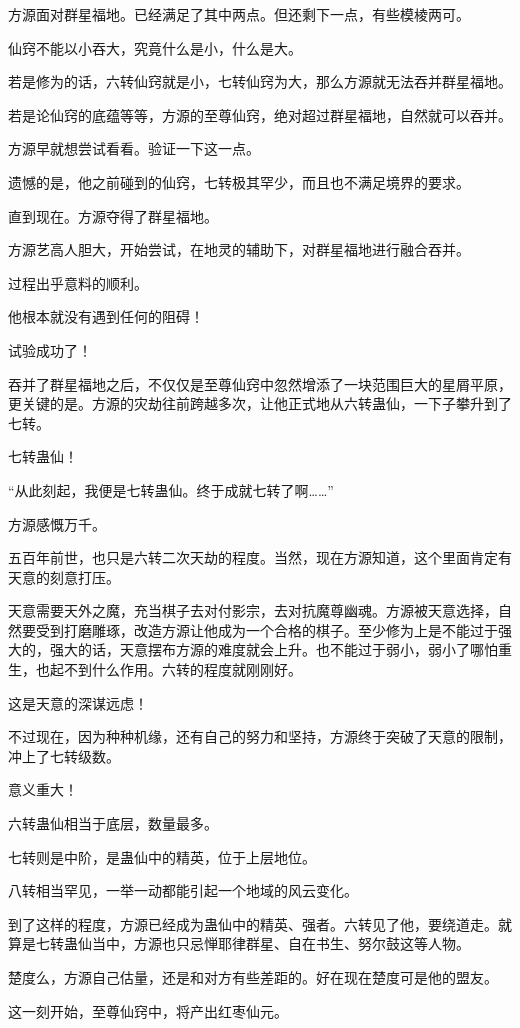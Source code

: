\begin{this_body}
方源面对群星福地。已经满足了其中两点。但还剩下一点，有些模棱两可。

仙窍不能以小吞大，究竟什么是小，什么是大。

若是修为的话，六转仙窍就是小，七转仙窍为大，那么方源就无法吞并群星福地。

若是论仙窍的底蕴等等，方源的至尊仙窍，绝对超过群星福地，自然就可以吞并。

方源早就想尝试看看。验证一下这一点。

遗憾的是，他之前碰到的仙窍，七转极其罕少，而且也不满足境界的要求。

直到现在。方源夺得了群星福地。

方源艺高人胆大，开始尝试，在地灵的辅助下，对群星福地进行融合吞并。

过程出乎意料的顺利。

他根本就没有遇到任何的阻碍！

试验成功了！

吞并了群星福地之后，不仅仅是至尊仙窍中忽然增添了一块范围巨大的星屑平原，更关键的是。方源的灾劫往前跨越多次，让他正式地从六转蛊仙，一下子攀升到了七转。

七转蛊仙！

“从此刻起，我便是七转蛊仙。终于成就七转了啊……”

方源感慨万千。

五百年前世，也只是六转二次天劫的程度。当然，现在方源知道，这个里面肯定有天意的刻意打压。

天意需要天外之魔，充当棋子去对付影宗，去对抗魔尊幽魂。方源被天意选择，自然要受到打磨雕琢，改造方源让他成为一个合格的棋子。至少修为上是不能过于强大的，强大的话，天意摆布方源的难度就会上升。也不能过于弱小，弱小了哪怕重生，也起不到什么作用。六转的程度就刚刚好。

这是天意的深谋远虑！

不过现在，因为种种机缘，还有自己的努力和坚持，方源终于突破了天意的限制，冲上了七转级数。

意义重大！

六转蛊仙相当于底层，数量最多。

七转则是中阶，是蛊仙中的精英，位于上层地位。

八转相当罕见，一举一动都能引起一个地域的风云变化。

到了这样的程度，方源已经成为蛊仙中的精英、强者。六转见了他，要绕道走。就算是七转蛊仙当中，方源也只忌惮耶律群星、自在书生、努尔鼓这等人物。

楚度么，方源自己估量，还是和对方有些差距的。好在现在楚度可是他的盟友。

这一刻开始，至尊仙窍中，将产出红枣仙元。


\end{this_body}
